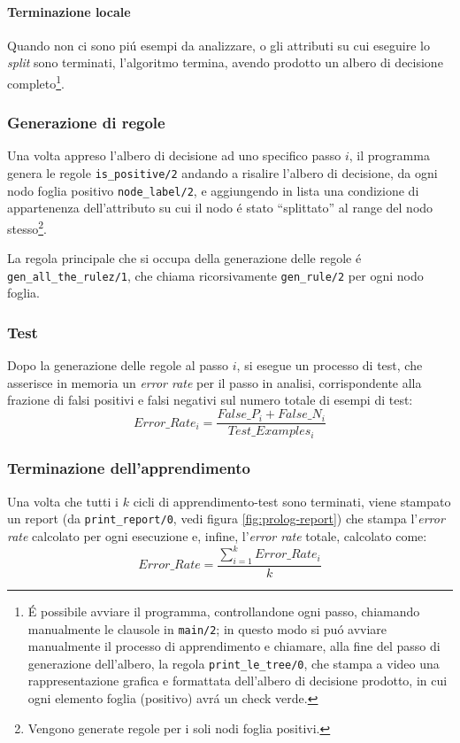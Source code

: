 \documentclass[preprint]{acm_proc_article-sp}
\begin{document}
\paragraph{Terminazione locale}
Quando non ci sono pi\'u esempi da analizzare, o gli attributi su cui eseguire lo \textit{split} sono terminati, l'algoritmo termina, avendo prodotto un albero di decisione completo\footnote{\'E possibile avviare il programma, controllandone ogni passo, chiamando manualmente le clausole in \verb|main/2|; in questo modo si pu\'o avviare manualmente il processo di apprendimento e chiamare, alla fine del passo di generazione dell'albero, la regola \verb|print_le_tree/0|, che stampa a video una rappresentazione grafica e formattata dell'albero di decisione prodotto, in cui ogni elemento foglia (positivo) avr\'a un check verde.}.

\subsubsection{Generazione di regole}
Una volta appreso l'albero di decisione ad uno specifico passo $i$, il programma genera le regole \verb|is_positive/2| andando a risalire l'albero di decisione, da ogni nodo foglia positivo \verb|node_label/2|, e aggiungendo in lista una condizione di appartenenza dell'attributo su cui il nodo \'e stato ``splittato'' al range del nodo stesso\footnote{Vengono generate regole per i soli nodi foglia positivi.}.

La regola principale che si occupa della generazione delle regole \'e \verb|gen_all_the_rulez/1|, che chiama ricorsivamente \verb|gen_rule/2| per ogni nodo foglia.

\subsubsection{Test}
Dopo la generazione delle regole al passo $i$, si esegue un processo di test, che asserisce in memoria un \textit{error rate} per il passo in analisi, corrispondente alla frazione di falsi positivi e falsi negativi sul numero totale di esempi di test:
\[ Error\_Rate_i = \frac{False\_P_i + False\_N_i}{Test\_Examples_i} \]

\subsubsection{Terminazione dell'apprendimento}
Una volta che tutti i $k$ cicli di apprendimento-test sono terminati, viene stampato un report (da \verb|print_report/0|, vedi figura \ref{fig:prolog-report}) che stampa l'\textit{error rate} calcolato per ogni esecuzione e, infine, l'\textit{error rate} totale, calcolato come:
\[ Error\_Rate = \frac{\sum_{i=1}^k Error\_Rate_i}{k} \]
\end{document}
